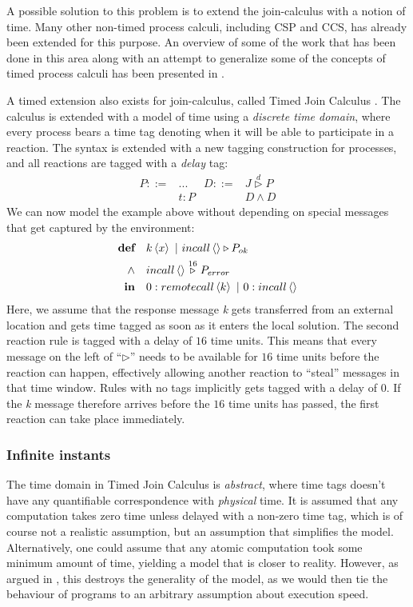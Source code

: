 A possible solution to this problem is to extend the join-calculus
with a notion of time. Many other non-timed process calculi, including
CSP and CCS, has already been extended for this purpose. An overview
of some of the work that has been done in this area along with an
attempt to generalize some of the concepts of timed process calculi
has been presented in \cite{nicollin-overview}.

A timed extension also exists for join-calculus, called Timed Join
Calculus \cite{timed-join}. The calculus is extended with a model of
time using a \emph{discrete time domain}, where every process bears a
time tag denoting when it will be able to participate in a reaction.
The syntax is extended with a new tagging construction for processes,
and all reactions are tagged with a
\emph{delay} tag:
\begin{align*}
  P ::={} & ...    & D ::={}& J \stackrel{d}{\triangleright} P \\
          & t : P  &        & D \land D
\end{align*}
We can now model the example above without depending on special
messages that get captured by the environment:
\begin{align*}
  \textbf{def}\quad & \atm k<x> ~|~ \atm incall<> \triangleright P_{ok} \\
  \land\quad & \atm incall<> \stackrel{16}{\triangleright} P_{error} \\
  \textbf{in}\quad & \atm 0:remotecall<k> ~|~ \atm 0:incall<>
\end{align*}
Here, we assume that the response message \emph{k} gets transferred
from an external location and gets time tagged as soon as it enters
the local solution.  The second reaction rule is tagged with a delay
of $16$ time units.  This means that every message on the left of
``$\triangleright$'' needs to be available for $16$ time units before
the reaction can happen, effectively allowing another reaction to
``steal'' messages in that time window. Rules with no tags implicitly
gets tagged with a delay of $0$. If the \emph{k} message therefore
arrives before the $16$ time units has passed, the first reaction can
take place immediately.


\subsubsection{Infinite instants}

The time domain in Timed Join Calculus is \emph{abstract}, where time
tags doesn't have any quantifiable correspondence with \emph{physical}
time. It is assumed that any computation takes zero time unless
delayed with a non-zero time tag, which is of course not a realistic
assumption, but an assumption that simplifies the model.
Alternatively, one could assume that any atomic computation took some
minimum amount of time, yielding a model that is closer to reality.
However, as argued in \cite{nicollin-overview}, this destroys the
generality of the model, as we would then tie the behaviour of programs
to an arbitrary assumption about execution speed.

